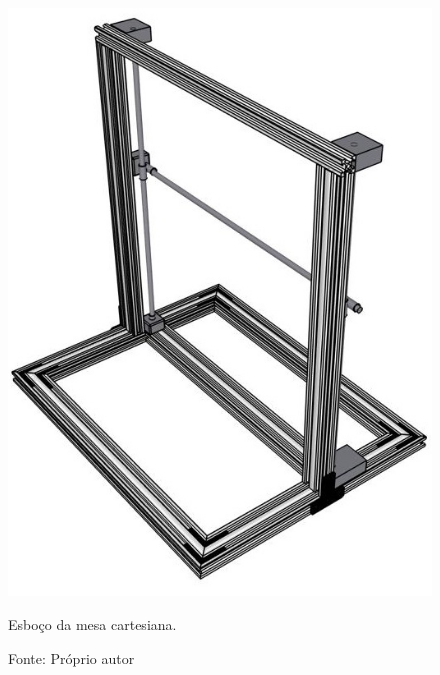\begin{figure}[H]
\centering
\includegraphics[scale = 1]{figuras/estruturamesa}
\caption{Esboço da mesa cartesiana.}
\caption*{Fonte: Próprio autor}
\label{fig:estruturamesa}
\end{figure}


